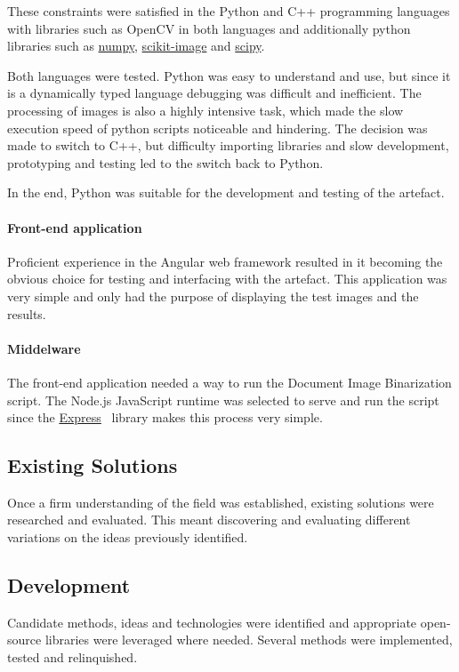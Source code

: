 \documentclass[a4paper, 12pt]{report}
\begin{document}
These constraints were satisfied in the Python and C++ programming languages with libraries such as OpenCV in both languages and additionally python libraries such as \href{https://numpy.org/}{numpy}, \href{https://scikit-image.org/}{scikit-image} and
\href{https://scikit-image.org/}{scipy}.\par

Both languages were tested. Python was easy to understand and use, but since it is a dynamically typed language debugging was difficult and inefficient. The processing of images is also a highly intensive task, which made the slow execution speed of python scripts noticeable and hindering. The decision was made to switch to C++, but difficulty importing libraries and slow development, prototyping and testing led to the switch back to Python.\par

In the end, Python was suitable for the development and testing of the artefact.

\paragraph{Front-end application}
Proficient experience in the Angular web framework resulted in it becoming the obvious choice for testing and interfacing with the artefact. This application was very simple and only had the purpose of displaying the test images and the results.

\paragraph{Middelware}
The front-end application needed a way to run the Document Image Binarization script.
The Node.js JavaScript runtime was selected to serve and run the script since the \href{https://expressjs.com/}{Express}~\cite{express} library makes this process very simple.

\subsection{Existing Solutions}
Once a firm understanding of the field was established, existing solutions were researched and evaluated. This meant discovering and evaluating different variations on the ideas previously identified.

\subsection{Development}
Candidate methods, ideas and technologies were identified and appropriate open-source libraries were leveraged where needed. Several methods were implemented, tested and relinquished.


\newpage
\printbibliography
\end{document}
